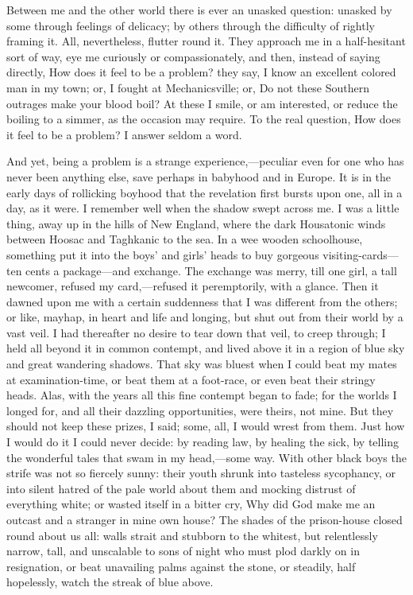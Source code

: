 \noindent Between me and the other world there is ever an unasked
question: unasked by some through feelings of delicacy; by others
through the difficulty of rightly framing it. All, nevertheless,
flutter round it. They approach me in a half-hesitant sort of way, eye
me curiously or compassionately, and then, instead of saying directly,
How does it feel to be a problem? they say, I know an excellent
 colored man in my town; or, I fought at Mechanicsville; or,
Do not these Southern outrages make your blood boil? At these I smile,
or am interested, or reduce the boiling to a simmer, as the occasion
may require. To the real question, How does it feel to be a problem? I
answer seldom a word.

And yet, being a problem is a strange experience,---pe\-cu\-liar even
for one who has never been anything else, save perhaps in babyhood and
in Europe. It is in the early days of rollicking boyhood that the
revelation first bursts upon one, all in a day, as it were. I
remember well when the shadow swept across me. I was a little thing,
away up in the hills of New England, where the dark Housatonic winds
between Hoosac and Taghkanic to the sea. In a wee wooden schoolhouse,
something put it into the boys' and girls' heads to buy gorgeous
visiting-cards---ten cents a package---and exchange. The exchange was
merry, till one girl, a tall newcomer, refused my card,---re\-fused it
peremptorily, with a glance. Then it dawned upon me with a certain
suddenness that I was different from the others; or like, mayhap, in
heart and life and longing, but shut out from their world by a vast
veil. I had thereafter no desire to tear down that veil, to creep
through; I held all beyond it in common contempt, and lived above it
in a region of blue sky and great wandering shadows. That sky was
bluest when I could beat my mates at examination-time, or beat them at
a foot-race, or even beat their stringy heads. Alas, with the years
all this fine contempt began to fade; for the worlds I longed for, and
all their dazzling opportunities, were  theirs, not mine. But
they should not keep these prizes, I said; some, all, I would wrest
from them. Just how I would do it I could never decide: by reading
law, by healing the sick, by telling the wonderful tales that swam
in my head,---some way. With other black boys the strife was not so
fiercely sunny: their youth shrunk into tasteless sycophancy, or into
silent hatred of the pale world about them and mocking distrust of
everything white; or wasted itself in a bitter cry, Why did God make
me an outcast and a stranger in mine own house? The shades of the
prison-house closed round about us all: walls strait and stubborn to
the whitest, but relentlessly narrow, tall, and unscalable to sons
of night who must plod darkly on in resignation, or beat unavailing
palms against the stone, or steadily, half hopelessly, watch the
streak of blue above.

